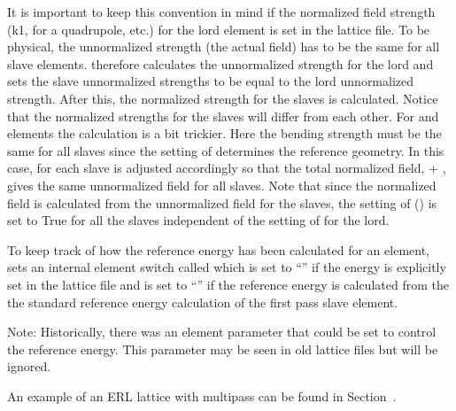 It is important to keep this convention in mind if the normalized field strength (k1, for a
quadrupole, etc.) for the lord element is set in the lattice file. To be physical, the unnormalized
strength (the actual field) has to be the same for all slave elements. \bmad therefore calculates
the unnormalized strength for the lord and sets the slave unnormalized strengths to be equal to the
lord unnormalized strength. After this, the normalized strength for the slaves is calculated. Notice
that the normalized strengths for the slaves will differ from each other. For  and
 elements the calculation is a bit trickier. Here the  bending strength must be the
same for all slaves since the setting of  determines the reference geometry. In this case,
 for each slave is adjusted accordingly so that the total normalized field,  +
, gives the same unnormalized field for all slaves. Note that since the normalized field
is calculated from the unnormalized field for the slaves, the setting of 
() is set to True for all the slaves independent of the setting of
 for the lord.

To keep track of how the reference energy has been calculated for an element, \bmad sets an internal
element switch called  which is set to ``'' if the energy is
explicitly set in the lattice file and is set to ``'' if the reference energy is
calculated from the the standard reference energy calculation of the first pass slave element.

Note: Historically, there was an element parameter  that could be set to control the
reference energy. This parameter may be seen in old lattice files but will be ignored.

An example of an ERL lattice with multipass can be found in Section~.
